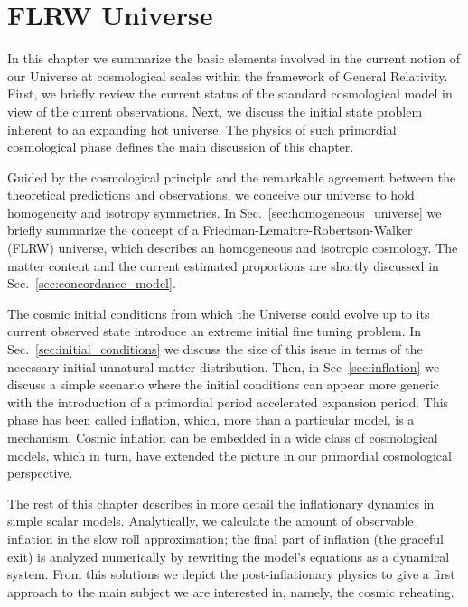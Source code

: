 \documentclass[12pt,letterpaper,twoside]{book}
\newcommand\etcomment[1]{\MakeUppercase{\mytexttt{\textcolor{blue}{#1}}}}
\begin{document}
\chapter{FLRW Universe}\label{ch:FRW}

\etcomment{Opening the Chapter}In this chapter we summarize the basic elements
involved in the current notion of our Universe at cosmological scales within the
framework of General Relativity. First, we briefly review the current status of
the standard cosmological model in view of the current observations. Next, we
discuss the initial state problem inherent to an expanding hot universe. The
physics of such primordial cosmological phase defines the main discussion of
this chapter.


\etcomment{Our universe is a FRW}Guided by the cosmological principle and the
remarkable agreement between the theoretical predictions and observations, we
conceive our universe to hold homogeneity and isotropy symmetries.  In
Sec.~\ref{sec:homogeneous_universe} we briefly summarize the concept of a
Friedman-Lemaitre-Robertson-Walker (FLRW) universe, which describes an
homogeneous and isotropic cosmology. The matter content and the current
estimated proportions are shortly discussed in Sec.~\ref{sec:concordance_model}.


\etcomment{Initial condition problem and inflation introduction}The cosmic
initial conditions from which the Universe could evolve up to its current
observed state introduce an extreme initial fine tuning problem. In
Sec.~\ref{sec:initial_conditions} we discuss the size of this issue in terms of
the necessary initial unnatural matter distribution. Then, in
Sec~\ref{sec:inflation} we discuss a simple scenario where the initial
conditions can appear more generic with the introduction of a primordial period
accelerated expansion period. This phase has been called inflation, which, more
than a particular model, is a mechanism. Cosmic inflation can be embedded in a
wide class of cosmological models, which in turn, have extended the picture in
our primordial cosmological perspective.


The rest of this chapter describes in more detail the inflationary dynamics in
simple scalar models. Analytically, we calculate the amount of observable
inflation in the slow roll approximation; the final part of inflation (the
graceful exit) is analyzed numerically by rewriting the model's equations as a
dynamical system. From this solutions we depict the post-inflationary physics to
give a first approach to the main subject we are interested in, namely, the
cosmic reheating.
\end{document}
